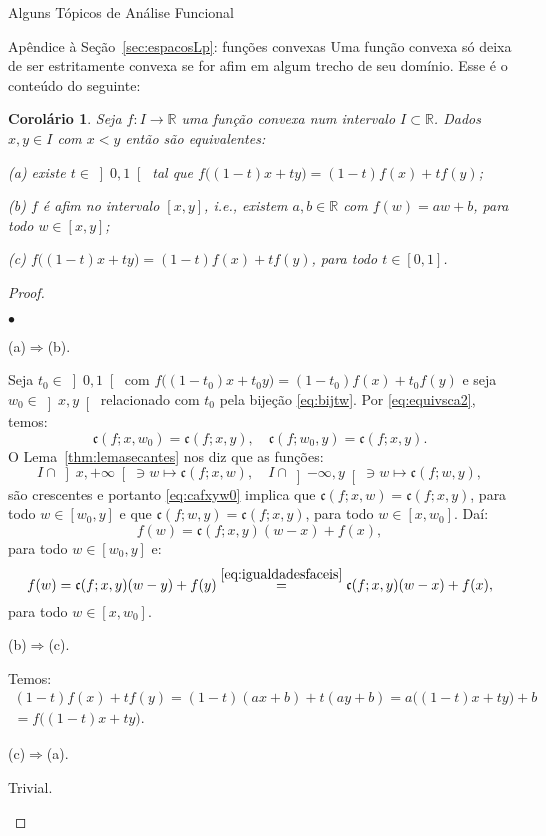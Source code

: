 \documentclass[oneside,final,11pt]{amsbook}
\newcommand{\R}{\mathds R}
\newcommand{\ca}{\mathfrak c}
\newcounter{contador}
\newenvironment{bulletindent}{\setcounter{contador}{0}
\begin{list} {$\bullet$}
{\usecounter{contador}
\setlength{\leftmargin}{10pt}
\setlength{\rightmargin}{10pt}
\setlength{\labelsep}{5pt}
\setlength{\itemsep}{10pt}
\setlength{\topsep}{10pt}}}
{\end{list}}
\theoremstyle{remark}\newtheorem{exercise}{Exercício}[chapter]
\theoremstyle{remark}\newtheorem{*exercise}[exercise]{\hbox to 0pt{\hskip 0pt minus 1fil*}Exercício}
\theoremstyle{definition}\newtheorem{exdefin}{Definição}[chapter]
\theoremstyle{plain}\newtheorem{teo}{Teorema}[section]
\theoremstyle{plain}\newtheorem{lem}[teo]{Lema}
\theoremstyle{plain}\newtheorem{prop}[teo]{Proposição}
\theoremstyle{plain}\newtheorem{cor}[teo]{Corolário}
\theoremstyle{definition}\newtheorem{defin}[teo]{Definição}
\theoremstyle{remark}\newtheorem{rem}[teo]{Observação}
\theoremstyle{definition}\newtheorem{notation}[teo]{Notação}
\theoremstyle{definition}\newtheorem{convention}[teo]{Convenção}
\theoremstyle{definition}\newtheorem{example}[teo]{Exemplo}
\numberwithin{section}{chapter}
\numberwithin{equation}{section}
\begin{document}
\begin{chapter}{Alguns Tópicos de Análise Funcional}
\begin{section}{Apêndice à Seção~\ref{sec:espacosLp}: funções convexas}
Uma função convexa só deixa de ser estritamente convexa se for afim em algum trecho de seu domínio.
Esse é o conteúdo do seguinte:
\begin{cor}
Seja $f:I\to\R$ uma função convexa num intervalo $I\subset\R$. Dados $x,y\in I$ com $x<y$ então são equivalentes:
\item[(a)] existe $t\in\left]0,1\right[$ tal que $f\big((1-t)x+ty\big)=(1-t)f(x)+tf(y)$;
\item[(b)] $f$ é {\em afim} no intervalo $[x,y]$,
i.e., existem $a,b\in\R$ com $f(w)=aw+b$, para todo $w\in[x,y]$;
\item[(c)] $f\big((1-t)x+ty\big)=(1-t)f(x)+tf(y)$, para todo $t\in[0,1]$.
\end{cor}
\begin{proof}\
\begin{bulletindent}
\item (a)$\Rightarrow$(b).

Seja $t_0\in\left]0,1\right[$ com $f\big((1-t_0)x+t_0y\big)=(1-t_0)f(x)+t_0f(y)$
e seja $w_0\in\left]x,y\right[$ relacionado com $t_0$ pela bijeção \eqref{eq:bijtw}.
Por \eqref{eq:equivsca2}, temos:
\begin{equation}\label{eq:cafxyw0}
\ca(f;x,w_0)=\ca(f;x,y),\quad\ca(f;w_0,y)=\ca(f;x,y).
\end{equation}
O Lema~\ref{thm:lemasecantes} nos diz que as funções:
\[I\cap\left]x,+\infty\right[\ni w\longmapsto\ca(f;x,w),\quad
I\cap\left]-\infty,y\right[\ni w\longmapsto\ca(f;w,y),\]
são crescentes e portanto \eqref{eq:cafxyw0} implica que
$\ca(f;x,w)=\ca(f;x,y)$, para todo $w\in[w_0,y]$ e que
$\ca(f;w,y)=\ca(f;x,y)$, para todo $w\in[x,w_0]$.
Daí:
\[f(w)=\ca(f;x,y)(w-x)+f(x),\]
para todo $w\in[w_0,y]$ e:
\[f(w)=\ca(f;x,y)(w-y)+f(y)\stackrel{\eqref{eq:igualdadesfaceis}}=\ca(f;x,y)(w-x)+f(x),\]
para todo $w\in[x,w_0]$.

\item (b)$\Rightarrow$(c).

Temos:
\begin{multline*}
(1-t)f(x)+tf(y)=(1-t)(ax+b)+t(ay+b)=a\big((1-t)x+ty\big)+b\\
=f\big((1-t)x+ty\big).
\end{multline*}

\item (c)$\Rightarrow$(a).

Trivial.\qedhere
\end{bulletindent}
\end{proof}


\end{section}
\end{chapter}
\end{document}
